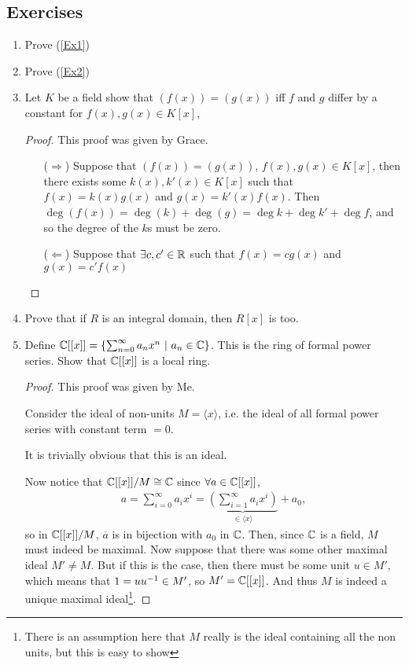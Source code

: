 \documentclass[12pt, twosided]{article}
\begin{document}
\subsection{Exercises}
\begin{enumerate}
\item Prove (\ref{Ex1})
\item Prove (\ref{Ex2})
\item Let \(K\) be a field show that \((f(x)) = (g(x))\) iff \(f\) and \(g\) differ by a constant for \(f(x), g(x) \in K[x]\),
  \begin{proof} This proof was given by Grace.
    \begin{enumerate} 
    \item [(\(\Rightarrow\))]Suppose that \((f(x)) = (g(x))\), \(f(x), g(x) \in K[x]\), then there exists some \(k(x), k\prime(x) \in K[x]\) such that \(f(x) = k(x)g(x)\) and \(g(x) = k\prime(x)f(x)\). Then \(\deg(f(x)) = \deg(k) + \deg(g) = \deg k + \deg k\prime + \deg f\), and so the degree of the \(k\)s must be zero.
    \item [(\(\Leftarrow\))] Suppose that \(\exists c, c\prime \in \R\) such that \(f(x) = cg(x)\) and \(g(x) = c\prime f(x)\)
    \end{enumerate}
  \end{proof}
\item Prove that if \(R\) is an integral domain, then \(R[x]\) is too.

\item Define \(\mathbb{C}[[x]] = \left\{ \sum_{n=0}^\infty a_nx^n \ \middle\vert\  a_n \in \mathbb{C}\right\}\). This is the ring of formal power series. Show that \(\mathbb{C}[[x]]\) is a local ring.

  \begin{proof} This proof was given by Me.
    
    Consider the ideal of non-units \(M = \langle x \rangle\), i.e. the ideal of all formal power series with constant term \(= 0\).

    It is trivially obvious that this is an ideal.

    Now notice that \(\mathbb{C}[[x]]/M \cong \mathbb{C}\) since \(\forall a \in \mathbb{C}[[x]]\),
    \begin{align*}
      a = \sum_{i=0}^\infty a_ix^i = \underbrace{\left(\sum_{i = 1}^\infty a_ix^i\right)}_{\in \langle x \rangle} + a_0,
    \end{align*}
    so in \(\mathbb{C}[[x]]/M\), \(\overline{a}\) is in bijection with \(a_0\) in \(\mathbb{C}\). Then, since \(\mathbb{C}\) is a field, \(M\) must indeed be maximal. Now suppose that there was some other maximal ideal \(M\prime \neq M\). But if this is the case, then there must be some unit \(u \in M\prime\), which means that \(1 = uu\1 \in M\prime\), so \(M\prime = \C[[x]]\). And thus \(M\) is indeed a unique maximal ideal\footnote{There is an assumption here that \(M\) really is the ideal containing all the non units, but this is easy to show}.
  \end{proof}
\end{enumerate}
\end{document}
